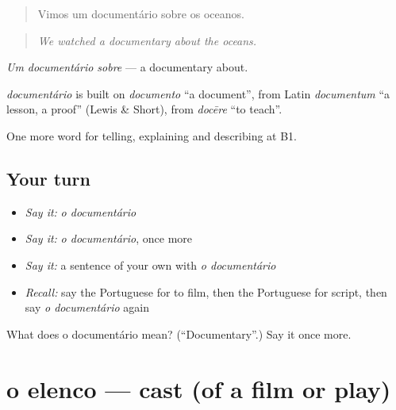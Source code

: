 \begin{quote}
Vimos um documentário sobre os oceanos.
\end{quote}

\begin{quote}
\emph{We watched a documentary about the oceans.}
\end{quote}

\emph{Um documentário sobre} — a documentary about.

\begin{cousinweb}
\emph{documentário} is built on \emph{documento} \textquotedblleft{}a document\textquotedblright{}, from Latin \emph{documentum} \textquotedblleft{}a lesson, a proof\textquotedblright{} (Lewis \& Short), from \emph{docēre} \textquotedblleft{}to teach\textquotedblright{}.
\end{cousinweb}

\begin{grammarlens}[title={What you've built}]
One more word for telling, explaining and describing at B1.
\end{grammarlens}

\subsection*{Your turn}
\begin{itemize}
\raggedright
  \item \emph{Say it:} \emph{o documentário}
  \item \emph{Say it:} \emph{o documentário}, once more
  \item \emph{Say it:} a sentence of your own with \emph{o documentário}
  \item \emph{Recall:} say the Portuguese for to film, then the Portuguese for script, then say \emph{o documentário} again
\end{itemize}

\begin{tcolorbox}[breakable,colback=teal!4,colframe=teal!35!black,title={Before you move on}]
What does o documentário mean? (\textquotedblleft{}Documentary\textquotedblright{}.) Say it once more.
\end{tcolorbox}
\section[o elenco]{o elenco — cast (of a film or play)}

\label{lesson:PT-C527-elenco}



